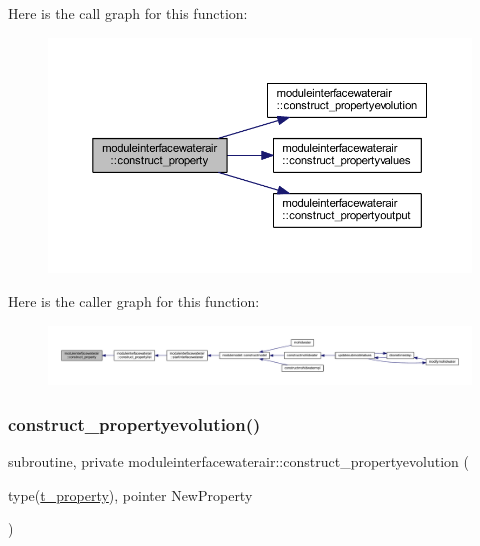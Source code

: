 Here is the call graph for this function\+:\nopagebreak
\begin{figure}[H]
\begin{center}
\leavevmode
\includegraphics[width=350pt]{namespacemoduleinterfacewaterair_a8f499486725a26a9dcb5b2bd07ba3af9_cgraph}
\end{center}
\end{figure}
Here is the caller graph for this function\+:\nopagebreak
\begin{figure}[H]
\begin{center}
\leavevmode
\includegraphics[width=350pt]{namespacemoduleinterfacewaterair_a8f499486725a26a9dcb5b2bd07ba3af9_icgraph}
\end{center}
\end{figure}
\mbox{\label{namespacemoduleinterfacewaterair_a49127aa503109a2b4f86aee6e0d4d665}} 
\subsubsection{\texorpdfstring{construct\+\_\+propertyevolution()}{construct\_propertyevolution()}}
{\footnotesize\ttfamily subroutine, private moduleinterfacewaterair\+::construct\+\_\+propertyevolution (\begin{DoxyParamCaption}\item[{type(\mbox{\hyperlink{structmoduleinterfacewaterair_1_1t__property}{t\+\_\+property}}), pointer}]{New\+Property }\end{DoxyParamCaption})\hspace{0.3cm}{\ttfamily [private]}}

